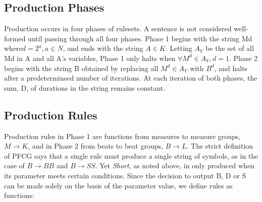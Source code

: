 \documentclass{article}
\begin{document}
\subsection{Production Phases}

Production occurs in four phases of rulesets. A sentence is not considered well-formed until passing through all four phases. Phase 1 begins with the string Md where$ d=2^a, a \in N$, and ends with the string $A \in K$. Letting $A_V$ be the set of all Md in A and all A’s variables, Phase 1 only halts when $\forall M^d \in A_V, d=1$. Phase 2 begins with the string B obtained by replacing all $M^d \in A_V$ with $B^d$, and halts after a predeterminsed number of iterations. At each iteration of both phases, the sum, D, of durations in the string remains constant.








\subsection{Production Rules}

Production rules in Phase 1 are functions from measures to measure groups, $M \rightarrow K$, and in Phase 2 from beats to beat groups, $B \rightarrow L$. The strict definition of PFCG says that a single rule must produce a single string of symbols, as in the case of $B \rightarrow BB$ and $B \rightarrow SS$.  Yet \emph{Short}, as noted above, in only produced when its parameter meets certain conditions. Since the decision to output B, D or S can be made solely on the basis of the parameter value, we define rules as functions:
\end{document}
